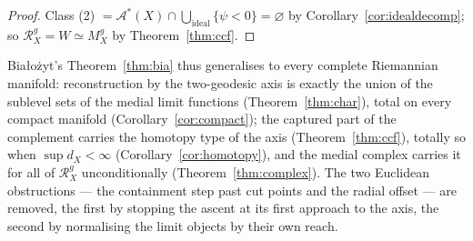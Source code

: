 \documentclass[11pt]{article}
\theoremstyle{remark}
\newcommand{\X}{X}
\newcommand{\Mg}{M^{g}_{\X}}
\newcommand{\Rg}{\mathcal{R}^{g}_{\X}}
\newcommand{\dX}{d_{\X}}
\newcommand{\Aub}{\mathcal{A}^{\ast}}
\begin{document}
\begin{proof}
Class (2) $=\Aub(\X)\cap\bigcup_{\mathrm{ideal}}\{\psi<0\}
=\varnothing$ by Corollary~\ref{cor:idealdecomp}; so
$\Rg=W\simeq\Mg$ by Theorem~\ref{thm:ccf}.
\end{proof}

\medskip
\noindent Bia\l{}o\.zyt's Theorem~\ref{thm:bia} thus generalises to
every complete Riemannian manifold: reconstruction by the
two-geodesic axis is exactly the union of the sublevel sets of the
medial limit functions (Theorem~\ref{thm:char}), total on every
compact manifold (Corollary~\ref{cor:compact}); the captured part of
the complement carries the homotopy type of the axis
(Theorem~\ref{thm:ccf}), totally so when $\sup\dX<\infty$
(Corollary~\ref{cor:homotopy}), and the medial complex carries it for
all of $\Rg$ unconditionally (Theorem~\ref{thm:complex}). The two
Euclidean obstructions --- the containment step past cut points and
the radial offset --- are removed, the first by stopping the ascent
at its first approach to the axis, the second by normalising the
limit objects by their own reach.
\end{document}
